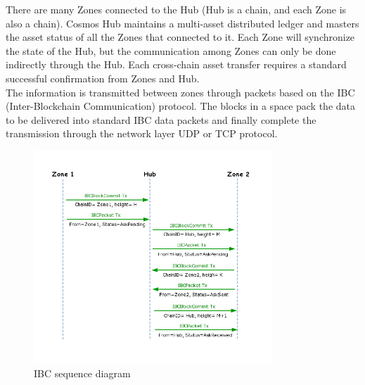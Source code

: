 \noindent There are many Zones connected to the Hub (Hub is a chain, and each Zone is also a chain). Cosmos Hub maintains a multi-asset distributed ledger and masters the asset status of all the Zones that connected to it. Each Zone will synchronize the state of the Hub, but the communication among Zones can only be done indirectly through the Hub. Each cross-chain asset transfer requires a standard successful confirmation from Zones and Hub. \\
\noindent The information is transmitted between zones through packets based on the IBC (Inter-Blockchain Communication) protocol. The blocks in a space pack the data to be delivered into standard IBC data packets and finally complete the transmission through the network layer UDP or TCP protocol.
        \begin{figure}[H]
        \includegraphics[width=0.8\textwidth]{./figures/IBC.png}
        \centering
        \caption{IBC sequence diagram}%
        \centering
        \label{fig:IBC}
        \end{figure}
